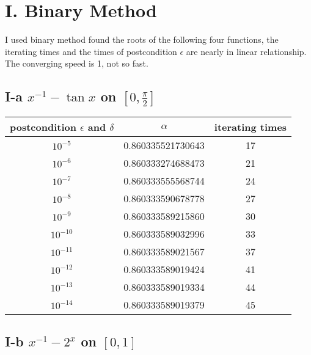 \documentclass[twoside,a4paper]{article}
\begin{document}
\pagestyle{fancy}
\fancyhead{}


\section*{I. \small{Binary Method}}
I used binary method found the roots of the following 
four functions, the iterating times and the times of postcondition $\epsilon$
are nearly in linear relationship. The converging speed is 1, not so fast.

\subsection*{I-a \small{$x^{-1}-\tan x $ on $[0,\frac{\pi}{2}]$}} 

\begin{tabular}{|c|c|c|}
\hline
postcondition $\epsilon$ and $\delta$ & $\alpha$ & iterating times\\
\hline
$10^{-5}$ & 0.860335521730643  &     17\\
\hline
$10^{-6}$ & 0.860333274688473  &     21\\
\hline
$10^{-7}$ & 0.860333555568744  &     24\\
\hline
$10^{-8}$ & 0.860333590678778  &     27\\
\hline
$10^{-9}$ & 0.860333589215860  &     30\\
\hline
$10^{-10}$ & 0.860333589032996  &     33\\
\hline
$10^{-11}$ & 0.860333589021567  &     37\\
\hline
$10^{-12}$ & 0.860333589019424  &     41\\
\hline
$10^{-13}$ & 0.860333589019334  &     44\\
\hline
$10^{-14}$ & 0.860333589019379  &     45\\
\hline
\end{tabular}

\subsection*{I-b \small{$x^{-1}-2^{x}$ on $[0,1]$}} 
\end{document}
